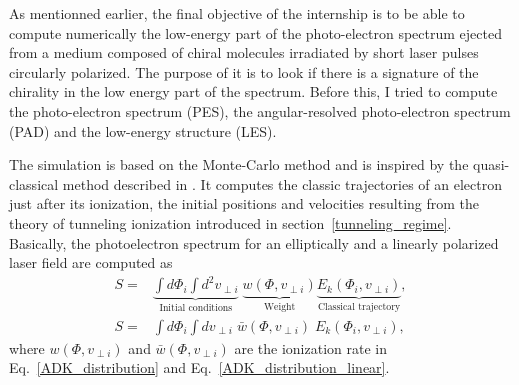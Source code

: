 \documentclass[a4paper]{article}
\begin{document}
As mentionned earlier, the final objective of the internship is to be able to compute numerically the low-energy part of the photo-electron spectrum ejected from a medium composed of chiral molecules irradiated by short laser pulses circularly polarized. The purpose of it is to look if there is a signature of the chirality in the low energy part of the spectrum. Before this, I tried to compute the photo-electron spectrum (PES), the angular-resolved photo-electron spectrum (PAD) and the low-energy structure (LES). 
\par
The simulation is based on the Monte-Carlo method and is inspired by the quasi-classical method described in \cite{Hu_1997, Kastner_2012_pulse}. It computes the classic trajectories of an electron just after its ionization, the initial positions and velocities resulting from the theory of tunneling ionization introduced in section~\ref{tunneling_regime}. Basically, the photoelectron spectrum for an elliptically and a linearly polarized laser field are computed as
\begin{align}
\label{ATI_analytical}
S=& \underbrace{\int d\Phi_{i} \int d^{2}v_{\perp i} }_{\text{Initial conditions}} \; \underbrace{w(\Phi, v_{\perp i})}_{\text{Weight}} \underbrace{E_{k}(\Phi_{i}, v_{\perp i}) }_{\text{Classical trajectory}}, \\
S=& \int d\Phi_{i} \int dv_{\perp i} \; \bar w(\Phi, v_{\perp i}) \; E_{k}(\Phi_{i}, v_{\perp i}),
\end{align}
where $w(\Phi, v_{\perp i})$ and $\bar w(\Phi, v_{\perp i})$ are the ionization rate in Eq.~\eqref{ADK_distribution} and Eq.~\eqref{ADK_distribution_linear}.
\end{document}
